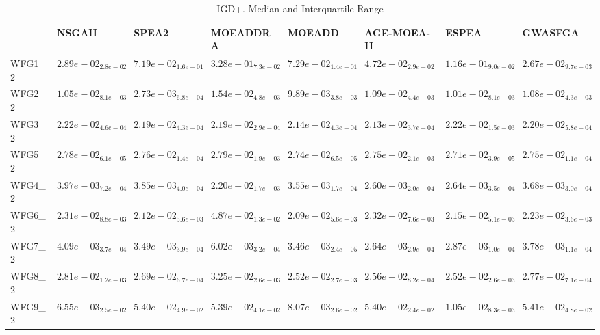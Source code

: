 \documentclass{article}
\begin{document}
\begin{landscape}
\begin{table}
\caption{IGD+. Median and Interquartile Range}
\label{table: IGD+}
\centering
\begin{scriptsize}
\begin{tabular}{llllllll}
\hline & NSGAII & SPEA2 & MOEADDRA & MOEADD & AGE-MOEA-II & ESPEA &  GWASFGA\\
\hline 
WFG1\_2 & \cellcolor{gray25}$  2.89e-02_{ 2.8e-02}$ & $  7.19e-02_{ 1.6e-01}$ & $  3.28e-01_{ 7.3e-02}$ & $  7.29e-02_{ 1.4e-01}$ & $  4.72e-02_{ 2.9e-02}$ & $  1.16e-01_{ 9.0e-02}$ & \cellcolor{gray95}$  2.67e-02_{ 9.7e-03}$ \\
WFG2\_2 & $  1.05e-02_{ 8.1e-03}$ & \cellcolor{gray95}$  2.73e-03_{ 6.8e-04}$ & $  1.54e-02_{ 4.8e-03}$ & \cellcolor{gray25}$  9.89e-03_{ 3.8e-03}$ & $  1.09e-02_{ 4.4e-03}$ & $  1.01e-02_{ 8.1e-03}$ & $  1.08e-02_{ 4.3e-03}$ \\
WFG3\_2 & $  2.22e-02_{ 4.6e-04}$ & $  2.19e-02_{ 4.3e-04}$ & $  2.19e-02_{ 2.9e-04}$ & \cellcolor{gray25}$  2.14e-02_{ 4.3e-04}$ & \cellcolor{gray95}$  2.13e-02_{ 3.7e-04}$ & $  2.22e-02_{ 1.5e-03}$ & $  2.20e-02_{ 5.8e-04}$ \\
WFG5\_2 & $  2.78e-02_{ 6.1e-05}$ & $  2.76e-02_{ 1.4e-04}$ & $  2.79e-02_{ 1.9e-03}$ & \cellcolor{gray25}$  2.74e-02_{ 6.5e-05}$ & $  2.75e-02_{ 2.1e-03}$ & \cellcolor{gray95}$  2.71e-02_{ 3.9e-05}$ & $  2.75e-02_{ 1.1e-04}$ \\
WFG4\_2 & $  3.97e-03_{ 7.2e-04}$ & $  3.85e-03_{ 4.0e-04}$ & $  2.20e-02_{ 1.7e-03}$ & $  3.55e-03_{ 1.7e-04}$ & \cellcolor{gray95}$  2.60e-03_{ 2.0e-04}$ & \cellcolor{gray25}$  2.64e-03_{ 3.5e-04}$ & $  3.68e-03_{ 3.0e-04}$ \\
WFG6\_2 & $  2.31e-02_{ 8.8e-03}$ & \cellcolor{gray25}$  2.12e-02_{ 5.6e-03}$ & $  4.87e-02_{ 1.3e-02}$ & \cellcolor{gray95}$  2.09e-02_{ 5.6e-03}$ & $  2.32e-02_{ 7.6e-03}$ & $  2.15e-02_{ 5.1e-03}$ & $  2.23e-02_{ 3.6e-03}$ \\
WFG7\_2 & $  4.09e-03_{ 3.7e-04}$ & $  3.49e-03_{ 3.9e-04}$ & $  6.02e-03_{ 3.2e-04}$ & $  3.46e-03_{ 2.4e-05}$ & \cellcolor{gray95}$  2.64e-03_{ 2.9e-04}$ & \cellcolor{gray25}$  2.87e-03_{ 1.0e-04}$ & $  3.78e-03_{ 1.1e-04}$ \\
WFG8\_2 & $  2.81e-02_{ 1.2e-03}$ & $  2.69e-02_{ 6.7e-04}$ & $  3.25e-02_{ 2.6e-03}$ & \cellcolor{gray95}$  2.52e-02_{ 2.7e-03}$ & $  2.56e-02_{ 8.2e-04}$ & \cellcolor{gray25}$  2.52e-02_{ 2.6e-03}$ & $  2.77e-02_{ 7.1e-04}$ \\
WFG9\_2 & \cellcolor{gray95}$  6.55e-03_{ 2.5e-02}$ & $  5.40e-02_{ 4.9e-02}$ & $  5.39e-02_{ 4.1e-02}$ & \cellcolor{gray25}$  8.07e-03_{ 2.6e-02}$ & $  5.40e-02_{ 2.4e-02}$ & $  1.05e-02_{ 8.3e-03}$ & $  5.41e-02_{ 4.8e-02}$ \\

\end{tabular}
\end{scriptsize}
\end{table}
\end{landscape}
\end{document}
